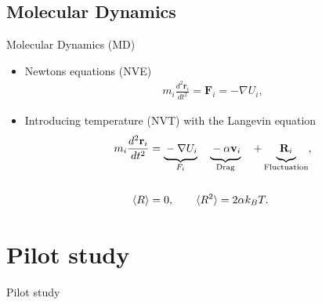 \documentclass[
	10pt, %
]{beamer}
\renewcommand{\vec}[1]{\mathbf{#1}} %
\begin{document}
\subsection{Molecular Dynamics}
\begin{frame}{Molecular Dynamics (MD)}
	\begin{itemize}
		\item Newtons equations (NVE)
		\begin{align*}
			m_i \frac{d^2 \vec{r}_i}{dt^2} = \vec{F}_i = -\nabla U_i,
		\end{align*}
		\item Introducing temperature (NVT) with the Langevin equation
		\begin{align*}
			m_i \frac{d^2 \vec{r}_i}{dt^2} &= \underbrace{\strut -\nabla U_i}_{F_i} \quad \underbrace{\strut -\alpha \vec{v}_i}_{\text{Drag}} \quad  + \underbrace{\strut \vec{R}_i}_{\text{Fluctuation}}, \\
			\\
			\langle R \rangle &= 0, \qquad \langle R^2 \rangle = 2\alpha k_B T.
		\end{align*}
	\end{itemize}
\end{frame}


\section{Pilot study} %
\begin{frame}{Pilot study}
    \tableofcontents[currentsection]
\end{frame}
\end{document}
